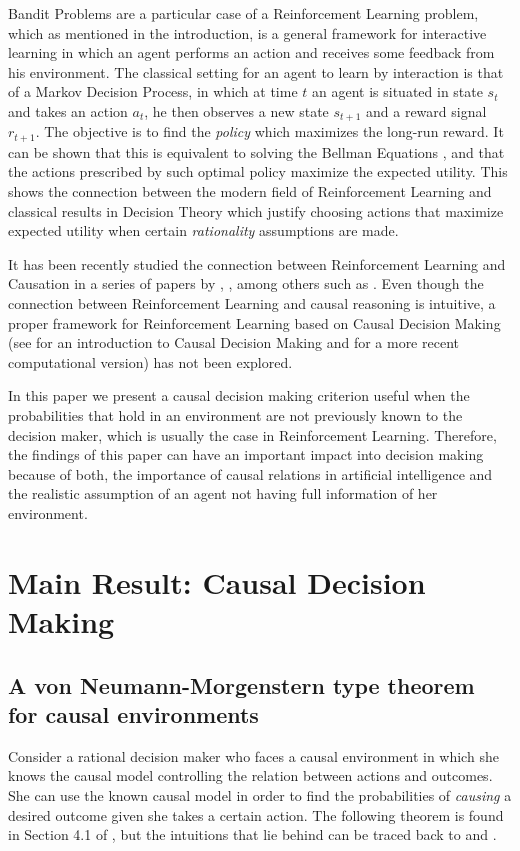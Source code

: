 \documentclass{svjour3}                     %
\begin{document}
Bandit Problems are a particular case of a Reinforcement Learning problem, which as mentioned in the introduction, is a general framework for interactive learning in which an agent performs an action and receives some feedback from his environment. The classical setting for an agent to learn by interaction is that of a Markov Decision Process, in which at time $t$ an agent is situated in state $s_t$ and takes an action $a_t$, he then observes a new state $s_{t+1}$ and a reward signal $r_{t+1}$. The objective is to find the \textit{policy} which maximizes the long-run reward. It can be shown that this is equivalent to solving the Bellman Equations \citep{sutton1998reinforcement}, and that the actions prescribed by such optimal policy maximize the expected utility. This shows the connection between the modern field of Reinforcement Learning and classical results in Decision Theory which justify choosing actions that maximize expected utility when certain \textit{rationality} assumptions are made. 

It has been recently studied the connection between Reinforcement Learning and Causation in a series of papers by \cite{gershman2015reinforcement}, \cite{lattimoreNIPS2016}, \cite{bareinboim2015bandits} among others such as \citep{zhang2016markov, zhang2017transfer, lee2019structural, correa2019statistical, zhang2019near}. Even though the connection between Reinforcement Learning and causal reasoning is intuitive, a proper  framework for Reinforcement Learning based on Causal Decision Making (see \cite{joyce1999foundations} for an introduction to Causal Decision Making and \cite{pearl2009causality} for a more recent computational version) has not been explored. 

In this paper we present a causal decision making criterion useful when the probabilities that hold in an environment are not previously known to the decision maker, which is usually the case in Reinforcement Learning. Therefore, the findings of this paper can have an important impact into decision making because of both, the importance of causal relations in artificial intelligence and the realistic assumption of an agent not having full information of her environment. 

\section{Main Result: Causal Decision Making}
\label{causal_results}
\subsection{A von Neumann-Morgenstern type theorem for causal environments}
Consider a rational decision maker who faces a causal environment in which she knows the causal model controlling the relation between actions and outcomes. She can use the known causal model in order to find the probabilities of \textit{causing} a desired outcome given she takes a certain action. The following theorem is found in Section 4.1 of \cite{pearl2009causality}, but the intuitions that lie behind can be traced back to \cite{lewis1981causal} and \cite{joyce1999foundations}.
\end{document}
